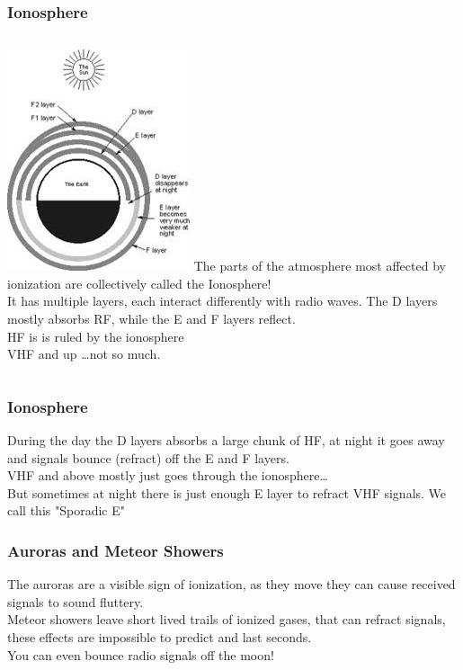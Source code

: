 \documentclass[10pt]{beamer}
\begin{document}
\begin{frame}
\frametitle{Ionosphere}
\begin{columns}
\includegraphics[height=.9\textheight]{ionosphere.png}
The parts of the atmosphere most affected by ionization are collectively called the Ionosphere!\\
It has multiple layers, each interact differently with radio waves. The D layers mostly absorbs RF, while the E and F layers reflect.\\
HF is is ruled by the ionosphere\\ VHF and up \ldots not so much.
\end{columns}
\end{frame}

\begin{frame}
\frametitle{Ionosphere}
During the day the D layers absorbs a large chunk of HF, at night it goes away and signals bounce (refract) off the E and F layers.\\
VHF and above mostly just goes through the ionosphere\ldots\\
But sometimes at night there is just enough E layer to refract VHF signals. We call this "Sporadic E"
\end{frame}

\begin{frame}
\frametitle{Auroras and Meteor Showers}
The auroras are a visible sign of ionization, as they move they can cause received signals to sound fluttery.\\
Meteor showers leave short lived trails of ionized gases, that can refract signals, these effects are impossible to predict and last seconds.\\
You can even bounce radio signals off the moon!
\end{frame}
\end{document}
